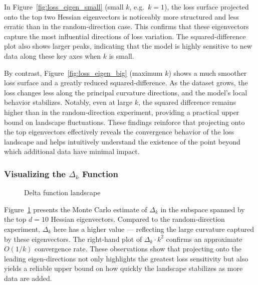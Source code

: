 \documentclass{article}
\begin{document}
In Figure~\ref{fig:loss_eigen_small} (small $k$, e.g.\ $k=1$), the loss surface projected onto the top two Hessian eigenvectors is
noticeably more structured and less erratic than in the random‐direction case. This confirms that these eigenvectors capture the
most influential directions of loss variation. The squared‐difference plot also shows larger peaks, indicating that the model is
highly sensitive to new data along these key axes when $k$ is small.

By contrast, Figure~\ref{fig:loss_eigen_big} (maximum $k$) shows a much smoother loss surface and a greatly reduced squared‐difference.
As the dataset grows, the loss changes less along the principal curvature directions, and the model’s local behavior stabilizes.
Notably, even at large $k$, the squared difference remains higher than in the random‐direction experiment, providing a practical upper
bound on landscape fluctuations. These findings reinforce that projecting onto the top eigenvectors effectively reveals the convergence
behavior of the loss landscape and helps intuitively understand the existence of the point beyond which additional data have minimal impact.

\subsubsection{Visualizing the \texorpdfstring{$\Delta_k$}{Delta k} Function}

\begin{figure}[!htbp]
  \hspace*{-2.6cm}
  \caption{Delta function landscape}
  \label{fig:delta_eigen}
\end{figure}

Figure~\ref{fig:delta_eigen} presents the Monte Carlo estimate of $\Delta_k$ in the subspace spanned by the top $d = 10$
Hessian eigenvectors. Compared to the random‐direction experiment, $\Delta_k$ here has a higher value --- reflecting the
large curvature captured by these eigenvectors. The right‐hand plot of $\Delta_k\cdot k^2$
confirms an approximate $O(1 / k)$ convergence rate. These observations show that projecting onto the leading eigen-directions not only
highlights the greatest loss sensitivity but also yields a reliable upper bound on how quickly the landscape stabilizes as more data are
added.
\end{document}
